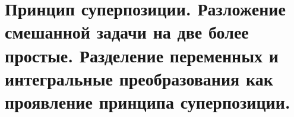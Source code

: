 \chapter{Принцип суперпозиции. Разложение смешанной задачи на две более
простые. Разделение переменных и интегральные преобразования как проявление
принципа суперпозиции.}

\newpage
